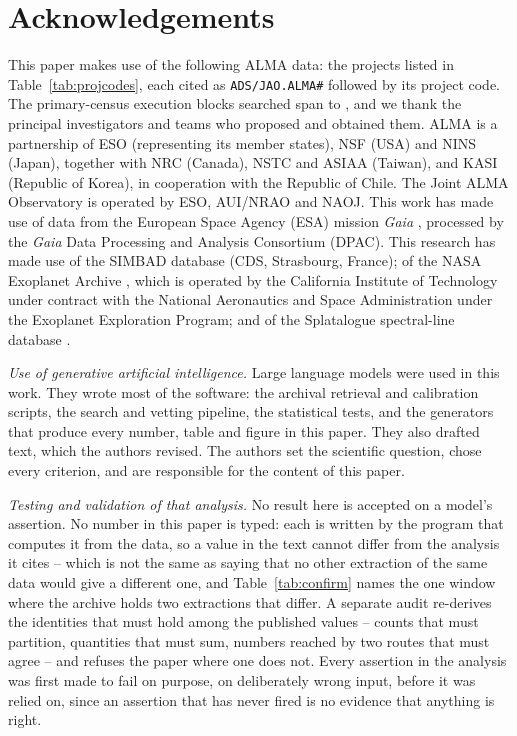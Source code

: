 \section*{Acknowledgements}
This paper makes use of the following ALMA data: the \NProjCodes{} projects
listed in Table~\ref{tab:projcodes}, each cited as \texttt{ADS/JAO.ALMA\#}
followed by its project code. The \NEB{} primary-census execution blocks
searched span \PrEbDateFirst{} to \PrEbDateLast{}, and we thank the principal
investigators and teams who proposed and obtained
them.\ProjCodeUnresClause{} ALMA is a partnership of ESO
(representing its member states), NSF (USA) and NINS (Japan), together with NRC
(Canada), NSTC and ASIAA (Taiwan), and KASI (Republic of Korea), in cooperation
with the Republic of Chile. The Joint ALMA Observatory is operated by ESO,
AUI/NRAO and NAOJ. This work has made use of data from the European Space
Agency (ESA) mission {\it Gaia} \citep{GaiaDR3}, processed by the {\it Gaia}
Data Processing and Analysis Consortium (DPAC). This research has made use
of the SIMBAD database \citep{SIMBAD2000} (CDS, Strasbourg, France); of the
NASA Exoplanet Archive \citep{NEA2013}, which is operated by the California
Institute of Technology under contract with the National Aeronautics and
Space Administration under the Exoplanet Exploration Program; and of the
Splatalogue spectral-line database \citep{Splatalogue2007}.

\emph{Use of generative artificial intelligence.} Large language models were
used in this work. They wrote most of the software: the archival retrieval and
calibration scripts, the search and vetting pipeline, the statistical tests,
and the generators that produce every number, table and figure in this paper.
They also drafted text, which the authors revised. The authors set the
scientific question, chose every criterion, and are responsible for the
content of this paper.

\emph{Testing and validation of that analysis.} No result here is accepted
on a model's assertion. No number in this paper is typed: each is written by
the program that computes it from the data, so a value in the text cannot
differ from the analysis it cites -- which is not the same as saying that no
other extraction of the same data would give a different one, and
Table~\ref{tab:confirm} names the one window where the archive holds two
extractions that differ. A separate audit re-derives the
identities that must hold among the published values -- counts that must
partition, quantities that must sum, numbers reached by two routes that must
agree -- and refuses the paper where one does not. Every assertion in the
analysis was first made to fail on purpose, on deliberately wrong input,
before it was relied on, since an assertion that has never fired is no
evidence that anything is right.


